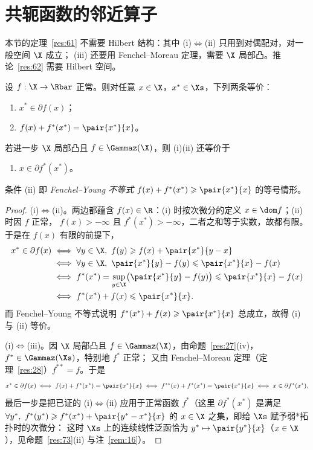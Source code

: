 \section{共轭函数的邻近算子}

本节的定理~\ref{res:61} 不需要 Hilbert 结构：其中 (i)$\iff$(ii) 只用到对偶配对，对一般空间 $\X$ 成立；
(iii) 还要用 Fenchel--Moreau 定理，需要 $\X$ 局部凸。推论~\ref{res:62} 需要 Hilbert 空间。

\begin{theorem}[次微分与共轭]
\label{res:61}
设 $f:\X\to\Rbar$ 正常。则对任意 $x\in\X$，$x^*\in\Xs$，下列两条等价：
\begin{enumerate}[label=(\roman*)]
  \item $x^*\in\partial f(x)$；
  \item $f(x)+f^*(x^*)=\pair{x^*}{x}$。
\end{enumerate}
若进一步 $\X$ 局部凸且 $f\in\Gammaz(\X)$，则 (i)(ii) 还等价于
\begin{enumerate}[label=(\roman*),start=3]
  \item $x\in\partial f^*(x^*)$。
\end{enumerate}
\end{theorem}

条件 (ii) 即 \emph{Fenchel--Young 不等式} $f(x)+f^*(x^*)\geqslant\pair{x^*}{x}$ 的等号情形。

\begin{proof}
(i)$\iff$(ii)。两边都蕴含 $f(x)\in\R$：(i) 时按次微分的定义 $x\in\dom f$；(ii) 时因 $f$ 正常，
$f(x)>-\infty$ 且 $f^*(x^*)>-\infty$，二者之和等于实数，故都有限。于是在 $f(x)$ 有限的前提下，
\[
  \begin{aligned}
  x^*\in\partial f(x)
  &\iff\forall y\in\X,\ f(y)\geqslant f(x)+\pair{x^*}{y-x}\\
  &\iff\forall y\in\X,\ \pair{x^*}{y}-f(y)\leqslant\pair{x^*}{x}-f(x)\\
  &\iff f^*(x^*)=\sup_{y\in\X}\bigl(\pair{x^*}{y}-f(y)\bigr)\leqslant\pair{x^*}{x}-f(x)\\
  &\iff f^*(x^*)+f(x)\leqslant\pair{x^*}{x}.
  \end{aligned}
\]
而 Fenchel--Young 不等式说明 $f^*(x^*)+f(x)\geqslant\pair{x^*}{x}$ 总成立，故得 (i) 与 (ii) 等价。

(i)$\iff$(iii)。因 $\X$ 局部凸且 $f\in\Gammaz(\X)$，由命题~\ref{res:27}(iv)，$f^*\in\Gammaz(\Xs)$，特别地 $f^*$ 正常；
又由 Fenchel--Moreau 定理（定理~\ref{res:28}）$f^{**}=f$。于是
\[
  x^*\in\partial f(x)\iff f(x)+f^*(x^*)=\pair{x^*}{x}
  \iff f^{**}(x)+f^*(x^*)=\pair{x^*}{x}
  \iff x\in\partial f^*(x^*),
\]
最后一步是把已证的 (i)$\iff$(ii) 应用于正常函数 $f^*$（这里 $\partial f^*(x^*)$ 是满足
$\forall y^*,\ f^*(y^*)\geqslant f^*(x^*)+\pair{y^*-x^*}{x}$ 的 $x\in\X$ 之集，即给 $\Xs$ 赋予弱*拓扑时的次微分：
这时 $\Xs$ 上的连续线性泛函恰为 $y^*\mapsto\pair{y^*}{x}$（$x\in\X$），见命题~\ref{res:73}(ii) 与注~\ref{rem:16}）。
\end{proof}

